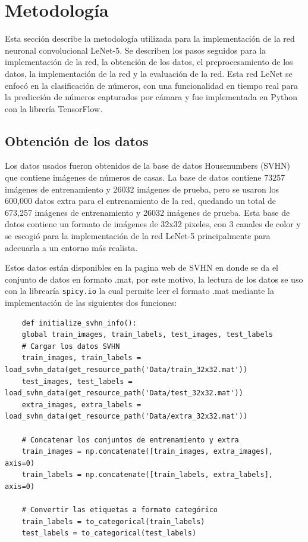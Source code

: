 \section{Metodología}
Esta sección describe la metodología utilizada para la implementación de la red neuronal convolucional LeNet-5. 
Se describen los pasos seguidos para la implementación de la red, la obtención de los datos, el preprocesamiento de los datos, 
la implementación de la red y la evaluación de la red.
Esta red LeNet se enfocó en la clasificación de números, con una funcionalidad en tiempo real
para la predicción de números capturados por cámara y fue implementada en Python con la librería TensorFlow.

\subsection{Obtención de los datos}
Los datos usados fueron obtenidos de la base de datos Housenumbers (SVHN) que contiene imágenes de números de casas.
La base de datos contiene 73257 imágenes de entrenamiento y 26032 imágenes de prueba, pero se usaron 
los 600,000 datos extra para el entrenamiento de la red, quedando un total de 673,257 imágenes de entrenamiento 
y 26032 imágenes de prueba. Esta base de datos contiene un formato de imágenes de 32x32 pixeles, con 3 canales de color 
y se escogió para la implementación de la red LeNet-5 principalmente para adecuarla a un entorno más realista.

Estos datos están disponibles en la pagina web de SVHN \cite{shvn_color} en donde se da el conjunto de datos en formato .mat, por este motivo, 
la lectura de los datos se uso con la librearía \texttt{spicy.io} la cual permite leer el formato .mat mediante la implementación
de las siguientes dos funciones:

\begin{lstlisting}
    def initialize_svhn_info():
    global train_images, train_labels, test_images, test_labels
    # Cargar los datos SVHN
    train_images, train_labels = load_svhn_data(get_resource_path('Data/train_32x32.mat'))
    test_images, test_labels = load_svhn_data(get_resource_path('Data/test_32x32.mat'))
    extra_images, extra_labels = load_svhn_data(get_resource_path('Data/extra_32x32.mat'))
    
    # Concatenar los conjuntos de entrenamiento y extra
    train_images = np.concatenate([train_images, extra_images], axis=0)
    train_labels = np.concatenate([train_labels, extra_labels], axis=0)

    # Convertir las etiquetas a formato categórico
    train_labels = to_categorical(train_labels)
    test_labels = to_categorical(test_labels)
\end{lstlisting}

